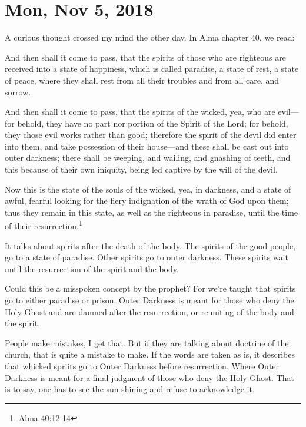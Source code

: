 \section{Mon, Nov 5, 2018}

A curious thought crossed my mind the other day. In Alma chapter 40, we read:

\begin{displayquote}
And then shall it come to pass, that the spirits of those who are righteous are 
received into a state of happiness, which is called paradise, a state of rest, a 
state of peace, where they shall rest from all their troubles and from all care, 
and sorrow.

And then shall it come to pass, that the spirits of the wicked, yea, who are evil—for 
behold, they have no part nor portion of the Spirit of the Lord; for behold, they 
chose evil works rather than good; therefore the spirit of the devil did enter into 
them, and take possession of their house—and these shall be cast out into outer 
darkness; there shall be weeping, and wailing, and gnashing of teeth, and this 
because of their own iniquity, being led captive by the will of the devil.

Now this is the state of the souls of the wicked, yea, in darkness, and a state of 
awful, fearful looking for the fiery indignation of the wrath of God upon them; thus 
they remain in this state, as well as the righteous in paradise, until the time of 
their resurrection.\footnote{Alma 40:12-14}
\end{displayquote}

It talks about spirits after the death of the body. The spirits of the good people, 
go to a state of paradise. Other spirits go to outer darkness. These spirits wait 
until the resurrection of the spirit and the body.

Could this be a misspoken concept by the prophet? For we're taught that spirits go 
to either paradise or prison. Outer Darkness is meant for those who deny the Holy 
Ghost and are damned after the resurrection, or reuniting of the body and the spirit.

People make mistakes, I get that. But if they are talking about doctrine of the
church, that is quite a mistake to make. If the words are taken as is, it describes
that whicked spriits go to Outer Darkness before resurrection. Where Outer Darkness
is meant for a final judgment of those who deny the Holy Ghost. That is to say, one
has to see the sun shining and refuse to acknowledge it.

